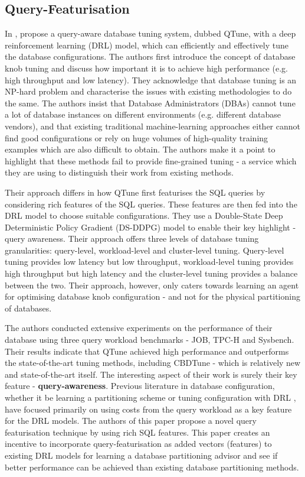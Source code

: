 \subsection{Query-Featurisation}
In \cite{DBLP:journals/pvldb/LiZLG19}, \citeauthor{DBLP:journals/pvldb/LiZLG19} propose a query-aware database tuning system, dubbed QTune, with a deep reinforcement learning (DRL) model, which can efficiently and effectively tune the database configurations. The authors first introduce the concept of database knob tuning and discuss how important it is to achieve high performance (e.g. high throughput and low latency). They acknowledge that database tuning is an NP-hard problem and characterise the issues with existing methodologies to do the same. The authors insist that Database Administrators (DBAs) cannot tune a lot of database instances on different environments (e.g. different database vendors), and that existing traditional machine-learning approaches either cannot find good configurations or rely on huge volumes of high-quality training examples which are also difficult to obtain. The authors make it a point to highlight that these methods fail to provide fine-grained tuning - a service which they are using to distinguish their work from existing methods.

Their approach differs in how QTune first featurises the SQL queries by considering rich features of the SQL queries. These features are then fed into the DRL model to choose suitable configurations. They use a Double-State Deep Deterministic Policy Gradient (DS-DDPG) model to enable their key highlight - query awareness. Their approach offers three levels of database tuning granularities: query-level, workload-level and cluster-level tuning. Query-level tuning provides low latency but low throughput, workload-level tuning provides high throughput but high latency and the cluster-level tuning provides a balance between the two. Their approach, however, only caters towards learning an agent for optimising database knob configuration - and not for the physical partitioning of databases.

The authors conducted extensive experiments on the performance of their database using three query workload benchmarks - JOB, TPC-H and Sysbench. Their results indicate that QTune achieved high performance and outperforms the state-of-the-art tuning methods, including CBDTune - which is relatively new and state-of-the-art itself. The interesting aspect of their work is surely their key feature - \textbf{query-awareness}.  Previous literature in database configuration, whether it be learning a partitioning scheme or tuning configuration with DRL \cite{Hilprecht:2019:TLP:3329859.3329876, DBLP:conf/sigmod/ZhangLZLXCXWCLR19}, have focused primarily on using costs from the query workload as a key feature for the DRL models. The authors of this paper propose a novel query featurisation technique by using rich SQL features. This paper creates an incentive to incorporate query-featurisation as added vectors (features) to existing DRL models for learning a database partitioning advisor and see if better performance can be achieved than existing database partitioning methods. 
